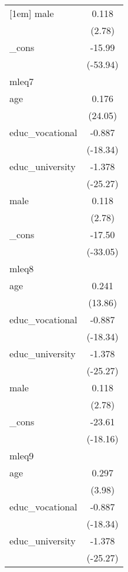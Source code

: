 {\begin{tabular}{l*{1}{c}}
[1em]
male        &       0.118\sym{**} \\
            &      (2.78)         \\
[1em]
\_cons      &      -15.99\sym{***}\\
            &    (-53.94)         \\
\hline
mleq7       &                     \\
age         &       0.176\sym{***}\\
            &     (24.05)         \\
[1em]
educ\_vocational&      -0.887\sym{***}\\
            &    (-18.34)         \\
[1em]
educ\_university&      -1.378\sym{***}\\
            &    (-25.27)         \\
[1em]
male        &       0.118\sym{**} \\
            &      (2.78)         \\
[1em]
\_cons      &      -17.50\sym{***}\\
            &    (-33.05)         \\
\hline
mleq8       &                     \\
age         &       0.241\sym{***}\\
            &     (13.86)         \\
[1em]
educ\_vocational&      -0.887\sym{***}\\
            &    (-18.34)         \\
[1em]
educ\_university&      -1.378\sym{***}\\
            &    (-25.27)         \\
[1em]
male        &       0.118\sym{**} \\
            &      (2.78)         \\
[1em]
\_cons      &      -23.61\sym{***}\\
            &    (-18.16)         \\
\hline
mleq9       &                     \\
age         &       0.297\sym{***}\\
            &      (3.98)         \\
[1em]
educ\_vocational&      -0.887\sym{***}\\
            &    (-18.34)         \\
[1em]
educ\_university&      -1.378\sym{***}\\
            &    (-25.27)         \\

\end{tabular}}
